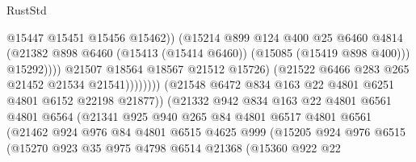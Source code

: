 \begin{lexlean}{RustStd}
\begin{coremodule}
                                                @15447
                                                @15451
                                                @15456
                                                @15462))
                                            (@15214
                                              @899
                                              @124
                                              @400
                                              @25
                                              @6460
                                              @4814
                                              (@21382
                                                @898
                                                @6460
                                                (@15413 (@15414 @6460))
                                                (@15085 (@15419 @898 @400)))
                                              @15292))))
                                      @21507
                                      @18564
                                      @18567
                                      @21512
                                      @15726)
                                    (@21522 @6466 @283 @265 @21452 @21534 @21541))))))))
                      (@21548 @6472 @834 @163 @22 @4801 @6251 @4801 @6152 @22198 @21877))
                    (@21332
                      @942
                      @834
                      @163
                      @22
                      @4801
                      @6561
                      @4801
                      @6564
                      (@21341
                        @925
                        @940
                        @265
                        @84
                        @4801
                        @6517
                        @4801
                        @6561
                        (@21462
                          @924
                          @976
                          @84
                          @4801
                          @6515
                          @4625
                          @999
                          (@15205
                            @924
                            @976
                            @6515
                            (@15270
                              @923
                              @35
                              @975
                              @4798
                              @6514
                              @21368
                              (@15360
                                @922
                                @22

\end{coremodule}
\end{lexlean}
